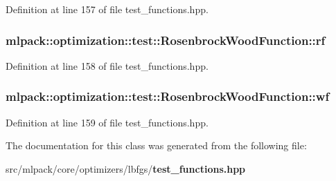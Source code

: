 Definition at line 157 of file test\-\_\-functions.\-hpp.

\subsubsection[{rf}]{ mlpack\-::optimization\-::test\-::\-Rosenbrock\-Wood\-Function\-::rf\hspace{0.3cm}{\ttfamily [private]}}\label{classmlpack_1_1optimization_1_1test_1_1RosenbrockWoodFunction_ac84bea4afa457ec97d671ceee56bc165}


Definition at line 158 of file test\-\_\-functions.\-hpp.

\subsubsection[{wf}]{ mlpack\-::optimization\-::test\-::\-Rosenbrock\-Wood\-Function\-::wf\hspace{0.3cm}{\ttfamily [private]}}\label{classmlpack_1_1optimization_1_1test_1_1RosenbrockWoodFunction_abcaa6f9433de5259df3e0b2f8e878123}


Definition at line 159 of file test\-\_\-functions.\-hpp.



The documentation for this class was generated from the following file\-:\begin{DoxyCompactItemize}
\item 
src/mlpack/core/optimizers/lbfgs/{\bf test\-\_\-functions.\-hpp}\end{DoxyCompactItemize}
